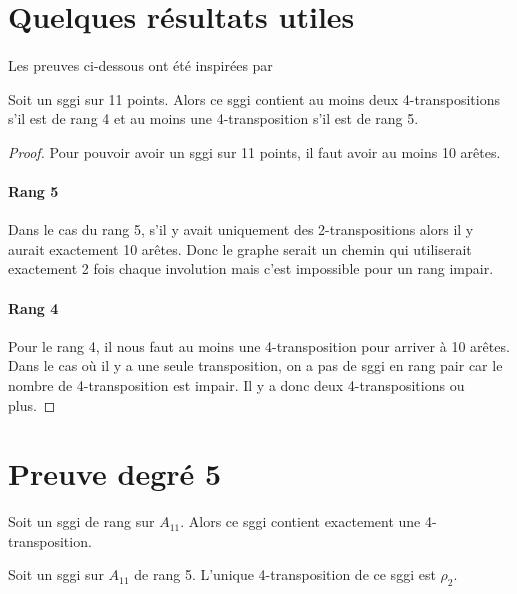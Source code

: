 \section{Quelques résultats utiles}

\paragraph{}
Les preuves ci-dessous ont été inspirées par~\cite{leemansTransactions}

\begin{lemma}
  Soit un sggi sur 11 points. Alors ce sggi contient au moins deux 4-transpositions s'il est de rang 4 et au moins une 4-transposition s'il est de rang 5.
\end{lemma}

\begin{proof}
  Pour pouvoir avoir un sggi sur 11 points, il faut avoir au moins 10 arêtes.

  \paragraph{Rang 5}
  Dans le cas du rang 5, s'il y avait uniquement des 2-transpositions alors il y aurait exactement 10 arêtes. Donc le graphe serait un chemin qui utiliserait exactement 2 fois chaque involution mais c'est impossible pour un rang impair.

  \paragraph{Rang 4} Pour le rang 4, il nous faut au moins une 4-transposition pour arriver à 10 arêtes. Dans le cas où il y a une seule transposition, on a pas de sggi en rang pair car le nombre de 4-transposition est impair. Il y a donc deux 4-transpositions ou plus.
\end{proof}

\cleardoublepage{}

\section{Preuve degré 5}

\begin{theorem}
  Soit un sggi de rang sur $A_{11}$. Alors ce sggi contient exactement une 4-transposition.
\end{theorem}

\begin{theorem}
  Soit un sggi sur $A_11$ de rang 5. L'unique 4-transposition de ce sggi est $\rho_2$.
\end{theorem}

